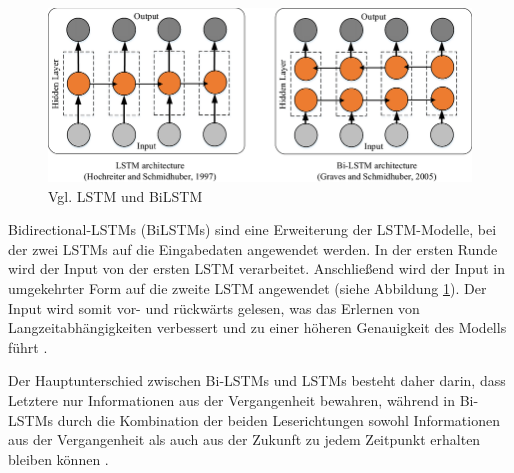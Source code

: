 \begin{figure}[htbp]
    \begin{center}
        \includegraphics[scale=0.4]{static/lstmvsbilstm.png}
        \caption{\label{fig:lstmvsbilstm} Vgl. LSTM und BiLSTM \cite{shen2021}}
    \end{center}
\end{figure}

Bidirectional-LSTMs (BiLSTMs) sind eine Erweiterung der LSTM-Modelle, bei der zwei LSTMs auf die Eingabedaten angewendet werden. 
In der ersten Runde wird der Input von der ersten LSTM verarbeitet. Anschließend wird der Input in umgekehrter Form auf die zweite LSTM
angewendet (siehe Abbildung \ref{fig:lstmvsbilstm}). Der Input wird somit vor- und rückwärts gelesen, was das Erlernen von 
Langzeitabhängigkeiten verbessert und zu einer höheren Genauigkeit des Modells führt \cite{siaminamini2019}. 

Der Hauptunterschied zwischen Bi-LSTMs und LSTMs besteht daher darin, dass Letztere nur 
Informationen aus der Vergangenheit bewahren, während in Bi-LSTMs durch die Kombination der beiden Leserichtungen sowohl Informationen 
aus der Vergangenheit als auch aus der Zukunft zu jedem Zeitpunkt erhalten bleiben können \cite{shen2021}.